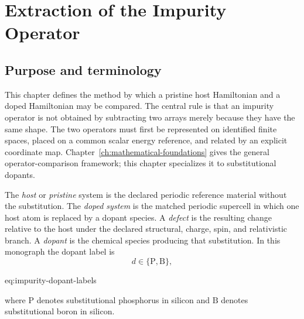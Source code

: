 \chapter{Extraction of the Impurity Operator}

\label{ch:impurity-operator-extraction}


\section{Purpose and terminology}

This chapter defines the method by which a pristine host Hamiltonian and a
doped Hamiltonian may be compared. The central rule is that an impurity
operator is not obtained by subtracting two arrays merely because they have the
same shape. The two operators must first be represented on identified finite
spaces, placed on a common scalar energy reference, and related by an explicit
coordinate map. Chapter~\ref{ch:mathematical-foundations} gives the general
operator-comparison framework; this chapter specializes it to substitutional
dopants.

\begin{definition}

The \emph{host} or \emph{pristine} system is the declared periodic reference
material without the substitution. The \emph{doped system} is the matched
periodic supercell in which one host atom is replaced by a dopant species. A
\emph{defect} is the resulting change relative to the host under the declared
structural, charge, spin, and relativistic branch. A \emph{dopant} is the
chemical species producing that substitution. In this monograph the dopant
label is
\begin{equation}
    d\in\{\mathrm P,\mathrm B\},
    \label{eq:impurity-dopant-labels}
\end{equation}
\begin{equationterms}{eq:impurity-dopant-labels}
\end{equationterms}
where $\mathrm P$ denotes substitutional phosphorus in silicon and $\mathrm B$
denotes substitutional boron in silicon.
\end{definition}

